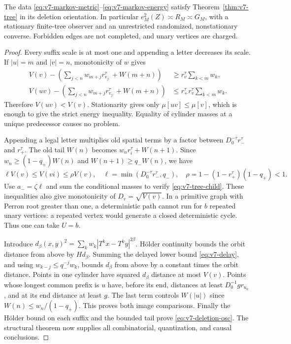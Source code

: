 \begin{corollary}
\label{cor:v7-markov}
The data \eqref{eq:v7-markov-metric}--\eqref{eq:v7-markov-energy}
satisfy Theorem~\ref{thm:v7-tree} in its deletion orientation.
In particular $e_M^2(Z)\asymp R_M\asymp G_M$, with a stationary
finite-tree observer and an unrestricted randomized, nonstationary
converse. Forbidden edges are not completed, and unary vertices are
charged.
\end{corollary}
\begin{proof}
Every suffix scale is at most one and appending a letter decreases its
scale. If $|u|=m$ and $|v|=n$, monotonicity of $w$ gives
\begin{align*}
 V(v)-\left(\sum_{j<n}w_{m+j}r_{v_{j:}}^\tau+W(m+n)\right)
 &\ge r_v^\tau\sum_{k<m}w_k,\\
 V(uv)-\left(\sum_{j<n}w_{m+j}r_{v_{j:}}^\tau+W(m+n)\right)
 &\le r_+^\tau r_v^\tau\sum_{k<m}w_k.
\end{align*}
Therefore $V(uv)<V(v)$. Stationarity gives only
$\mu[uv]\le\mu[v]$, which is enough to give the strict energy
inequality. Equality of cylinder masses at a unique predecessor causes
no problem.

Appending a legal letter multiplies old spatial terms by a factor
between $D_0^{-\tau}r_-^\tau$ and $r_+^\tau$. The old tail $W(n)$
becomes $w_nr_i^\tau+W(n+1)$. Since
$w_n\ge(1-q_+)W(n)$ and $W(n+1)\ge q_-W(n)$, we have
\[
 \ell V(v)\le V(vi)\le\rho V(v),\quad
 \ell=\min(D_0^{-\tau}r_-^\tau,q_-),\quad
 \rho=1-(1-r_+^\tau)(1-q_+)<1.
\]
Use $a_-=\zeta\ell$ and sum the conditional masses to verify
\eqref{eq:v7-tree-child}. These inequalities also give monotonicity of
$D_v=\sqrt{V(v)}$. In a primitive graph with Perron root greater than
one, a deterministic path cannot run for $b$ repeated unary vertices:
a repeated vertex would generate a closed deterministic cycle. Thus
one can take $U=b$.

Introduce $d_\beta(x,y)^2=\sum_kw_k|T^kx-T^ky|^{2\beta}$.
H\"older continuity bounds the orbit distance from above by $H d_\beta$.
Summing the delayed lower bound \eqref{eq:v7-delay}, and using
$w_{k-j}\le q_-^{-j}w_k$, bounds $d_\beta$ from above by a constant
times the orbit distance. Points in one cylinder have squared
$d_\beta$ distance at most $V(v)$. Points whose longest common prefix
is $u$ have, before its end, distances at least $D_0^{-1}g r_{u_{k:}}$,
and at its end distance at least $g$. The last term controls $W(|u|)$
since $W(n)\le w_n/(1-q_+)$. This proves both image comparisons.
Finally the H\"older bound on each suffix and the bounded tail prove
\eqref{eq:v7-deletion-osc}. The structural theorem now supplies all
combinatorial, quantization, and causal conclusions.
\end{proof}

